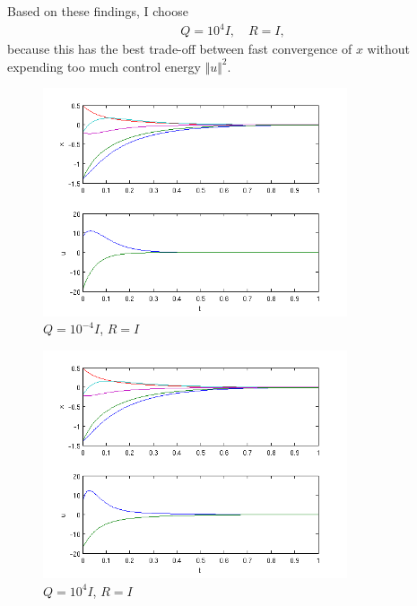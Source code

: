 \documentclass[letterpaper,11pt,titlepage]{article}
\begin{document}
\begin{enumerate}[leftmargin=0pt]
\begin{enumerate}
                    Based on these findings, I choose
                    \begin{gather}
                        Q=10^4 I, \quad R=I,
                    \end{gather}
                    because this has the best trade-off between fast convergence of $x$ without expending too much control energy $\Vert u\Vert^2$.

                    \begin{figure}
                        \centering
                        \includegraphics[width=0.8\textwidth]{hw5p3_-4}
                        \caption{$Q=10^{-4} I$, $R=I$}
                        \label{fig:p3_-4}
                    \end{figure}
                    \begin{figure}
                        \centering
                        \includegraphics[width=0.8\textwidth]{hw5p3_4}
                        \caption{$Q=10^{4} I$, $R=I$}
                        \label{fig:p3_4}
                    \end{figure}

\end{enumerate}
\end{enumerate}
\end{document}
